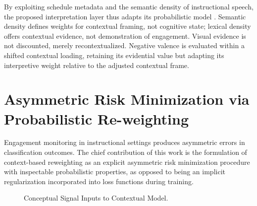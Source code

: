 \documentclass[conference]{IEEEtran}
\begin{document}
By exploiting schedule metadata and the semantic density of instructional speech, the proposed interpretation layer thus adapts its probabilistic model \cite{b10}. Semantic density defines weights for contextual framing, not cognitive state; lexical density offers contextual evidence, not demonstration of engagement. Visual evidence is not discounted, merely recontextualized. Negative valence is evaluated within a shifted contextual loading, retaining its evidential value but adapting its interpretive weight relative to the adjusted contextual frame.

\section{Asymmetric Risk Minimization via Probabilistic Re-weighting}

Engagement monitoring in instructional settings produces asymmetric errors in classification outcomes. The chief contribution of this work is the formulation of context-based reweighting as an explicit asymmetric risk minimization procedure with inspectable probabilistic properties, as opposed to being an implicit regularization incorporated into loss functions during training.

\begin{figure}[htbp]
\centering
{}
\caption{Conceptual Signal Inputs to Contextual Model.}
\label{fig:arch}
\end{figure}
\end{document}
